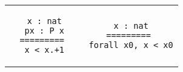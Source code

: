 \begin{landscape}
\begin{small}
\begin{multicols*}{3}[\begin{center}\section*{}\end{center}]
  \begin{tabular}{c@{$\to$}c} 
  \begin{minipage}{0.15\textwidth}\begin{lstlisting}
   x : nat
   px : P x
  =========
   x < x.+1
  \end{lstlisting}\end{minipage}
  &
  \begin{minipage}{0.15\textwidth}\begin{lstlisting}
   x : nat
  =========
   forall x0, x < x0
  \end{lstlisting}\end{minipage}
  \end{tabular}


\end{multicols*}
\end{small}
\end{landscape}
